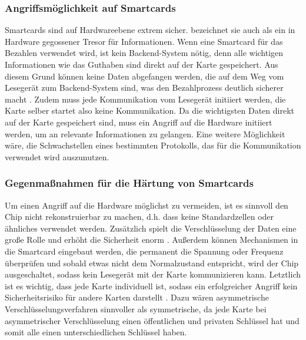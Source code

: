 \subsubsection{Angriffsmöglichkeit auf Smartcards}
Smartcards sind auf Hardwareebene extrem sicher. \cite{refmas:ASSS} bezeichnet sie auch als ein in Hardware gegossener
Tresor für Informationen. Wenn eine Smartcard für das Bezahlen verwendet wird, ist kein Backend-System nötig,
denn alle wichtigen Informationen wie das Guthaben sind direkt auf der Karte gespeichert. Aus diesem Grund können
keine Daten abgefangen werden, die auf dem Weg vom Lesegerät zum Backend-System sind, was den Bezahlprozess
deutlich sicherer macht \cite{refbook:WRHC}. Zudem muss jede Kommunikation vom Lesegerät initiiert werden, 
die Karte selber startet also keine Kommunikation. Da die wichtigsten Daten direkt auf der Karte gespeichert sind,
muss ein Angriff auf die Hardware initiiert werden, um an relevante Informationen zu gelangen. Eine weitere 
Möglichkeit wäre, die Schwachstellen eines bestimmten Protokolls, das für die Kommunikation verwendet wird auszunutzen.

\subsubsection{Gegenmaßnahmen für die Härtung von Smartcards}
Um einen Angriff auf die Hardware möglichst zu vermeiden, ist es sinnvoll den Chip nicht rekonstruierbar zu machen,
d.h. dass keine Standardzellen oder ähnliches verwendet werden. Zusätzlich spielt die Verschlüsselung 
der Daten eine große Rolle und erhöht die Sicherheit enorm \cite{refst:ARES}. Außerdem können Mechanismen in 
die Smartcard eingebaut werden, die permanent die Spannung oder Frequenz überprüfen und sobald etwas
nicht dem Normalzustand entspricht, wird der Chip ausgeschaltet, sodass kein Lesegerät mit der 
Karte kommunizieren kann. Letztlich ist es wichtig, dass jede Karte individuell ist, sodass ein 
erfolgreicher Angriff kein Sicherheitsrisiko für andere Karten darstellt \cite{refmas:ASSS}. 
Dazu wären asymmetrische Verschlüsselungsverfahren sinnvoller als symmetrische, da jede Karte bei
asymmetrischer Verschlüsselung einen öffentlichen und privaten Schlüssel hat und somit alle einen unterschiedlichen
Schlüssel haben.


